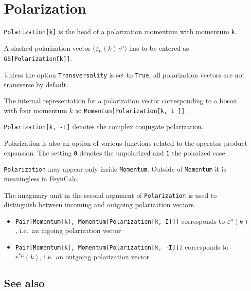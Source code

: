 \documentclass[../FeynCalcManual.tex]{subfiles}
\begin{document}
\hypertarget{polarization}{
\section{Polarization}\label{polarization}}

\texttt{Polarization[\allowbreak{}k]} is the head of a polarization
momentum with momentum \texttt{k}.

A slashed polarization vector (\(\varepsilon_{\mu}(k) \gamma^\mu)\) has
to be entered as \texttt{GS[\allowbreak{}Polarization[\allowbreak{}k]]}.

Unless the option \texttt{Transversality} is set to \texttt{True}, all
polarization vectors are not transverse by default.

The internal representation for a polarization vector corresponding to a
boson with four momentum \(k\) is:
\texttt{Momentum[\allowbreak{}Polarization[\allowbreak{}k,\ \allowbreak{}I ]]}.

\texttt{Polarization[\allowbreak{}k,\ \allowbreak{}-I]} denotes the
complex conjugate polarization.

Polarization is also an option of various functions related to the
operator product expansion. The setting \texttt{0} denotes the
unpolarized and \texttt{1} the polarized case.

\texttt{Polarization} may appear only inside \texttt{Momentum}. Outside
of \texttt{Momentum} it is meaningless in FeynCalc.

The imaginary unit in the second argument of \texttt{Polarization} is
used to distinguish between incoming and outgoing polarization vectors.

\begin{itemize}
\item
  \texttt{Pair[\allowbreak{}Momentum[\allowbreak{}k],\ \allowbreak{}Momentum[\allowbreak{}Polarization[\allowbreak{}k,\ \allowbreak{}I]]]}
  corresponds to \(\varepsilon^{\mu}(k)\), i.e.~an ingoing polarization
  vector
\item
  \texttt{Pair[\allowbreak{}Momentum[\allowbreak{}k],\ \allowbreak{}Momentum[\allowbreak{}Polarization[\allowbreak{}k,\ \allowbreak{}-I]]]}
  corresponds to \(\varepsilon^{\ast \mu}(k)\), i.e.~an outgoing
  polarization vector
\end{itemize}

\subsection{See also}
\end{document}
